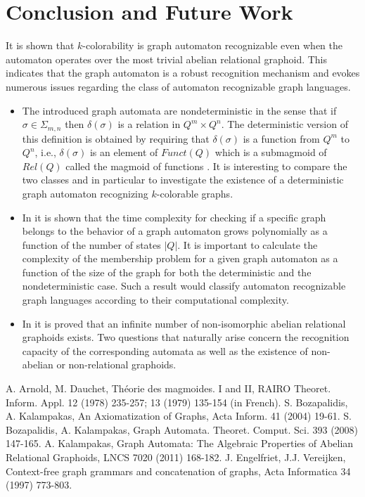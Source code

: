 \documentclass[runningheads,a4paper]{llncs}
\begin{document}
\section{Conclusion and Future Work}

It is shown that $k$-colorability is graph automaton recognizable even when the automaton operates over the most trivial abelian relational graphoid. This indicates that the graph automaton is a robust recognition mechanism and evokes numerous issues regarding the class of automaton recognizable graph languages.
\begin{itemize}
  \item The introduced graph automata are nondeterministic in the sense that if $\sigma\in \Sigma _{m,n}$ then $\delta (\sigma)$ is a relation in $Q^m\times Q^n$. The deterministic version of this definition is obtained by requiring that $\delta (\sigma)$ is a function from $Q^m$ to $Q^n$, i.e., $\delta (\sigma)$ is an element of $Funct (Q)$ which is a submagmoid of $Rel(Q)$ called the magmoid of functions \cite{BK3}. It is interesting to compare the two classes and in particular to investigate the existence of a deterministic graph automaton recognizing $k$-colorable graphs.
  \item In \cite{BK3} it is shown that the time complexity for checking if a specific graph belongs to the behavior of a graph automaton grows polynomially as a function of the number of states $|Q|$. It is important to calculate the complexity of the membership problem for a given graph automaton as a function of the size of the graph for both the deterministic and the nondeterministic case. Such a result would classify automaton recognizable graph languages according to their computational complexity.
  \item In \cite{Kal2} it is proved that an infinite number of non-isomorphic abelian relational graphoids exists. Two questions that naturally arise  concern  the recognition capacity of the corresponding automata as well as the existence of non-abelian or non-relational graphoids.
\end{itemize}

\begin{thebibliography}{99}
  A. Arnold, M. Dauchet, Th\'{e}orie des magmoides. I and II, RAIRO Theoret. Inform. Appl. 12 (1978) 235-257;
13 (1979) 135-154 (in French).
 S. Bozapalidis, A. Kalampakas,  An Axiomatization of Graphs, Acta Inform. 41 (2004) 19-61.
 S. Bozapalidis, A. Kalampakas,  Graph Automata. Theoret. Comput. Sci. 393 (2008) 147-165.
 A. Kalampakas, Graph Automata: The Algebraic Properties of Abelian Relational Graphoids, LNCS 7020 (2011) 168-182.
  J. Engelfriet,  J.J. Vereijken, Context-free graph grammars and concatenation of graphs, Acta Informatica 34 (1997) 773-803.
\end{thebibliography}
\end{document}

